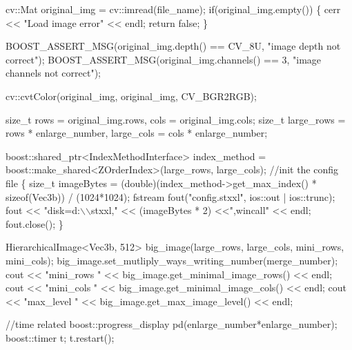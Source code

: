 \begin{DoxyCodeInclude}
        cv::Mat original\_img = cv::imread(file\_name);
        \textcolor{keywordflow}{if}(original\_img.empty()) \{
                cerr << \textcolor{stringliteral}{"Load image error"} << endl;
                \textcolor{keywordflow}{return} \textcolor{keyword}{false};
        \}

        BOOST\_ASSERT\_MSG(original\_img.depth() == CV\_8U, \textcolor{stringliteral}{"image depth not
       correct"});
        BOOST\_ASSERT\_MSG(original\_img.channels() == 3, \textcolor{stringliteral}{"image channels not
       correct"});

        cv::cvtColor(original\_img, original\_img, CV\_BGR2RGB);

        \textcolor{keywordtype}{size\_t} rows = original\_img.rows, cols = original\_img.cols;
        \textcolor{keywordtype}{size\_t} large\_rows = rows * enlarge\_number, large\_cols = cols * 
      enlarge\_number;

        boost::shared\_ptr<IndexMethodInterface> index\_method = 
      boost::make\_shared<ZOrderIndex>(large\_rows, large\_cols);
        \textcolor{comment}{//init the config file}
        \{
                \textcolor{keywordtype}{size\_t} imageBytes = (double)(index\_method->get\_max\_index() * \textcolor{keyword}{
      sizeof}(Vec3b)) / (1024*1024);
                fstream fout(\textcolor{stringliteral}{"config.stxxl"}, ios::out | ios::trunc);
                fout << \textcolor{stringliteral}{"disk=d:\(\backslash\)\(\backslash\)stxxl,"} << (imageBytes * 2) <<\textcolor{stringliteral}{",wincall"} << 
      endl;
                fout.close();
        \}

        HierarchicalImage<Vec3b, 512> big\_image(large\_rows, large\_cols, 
      mini\_rows, mini\_cols);
        big\_image.set_mutliply_ways_writing_number(merge\_number);
        cout << \textcolor{stringliteral}{"mini\_rows "} << big\_image.get_minimal_image_rows() << endl;
        cout << \textcolor{stringliteral}{"mini\_cols "} << big\_image.get\_minimal\_image\_cols() << endl;
        cout << \textcolor{stringliteral}{"max\_level "} << big\_image.get_max_image_level() << endl;

        \textcolor{comment}{//time related}
        boost::progress\_display pd(enlarge\_number*enlarge\_number);
        boost::timer t;
        t.restart();


\end{DoxyCodeInclude}

